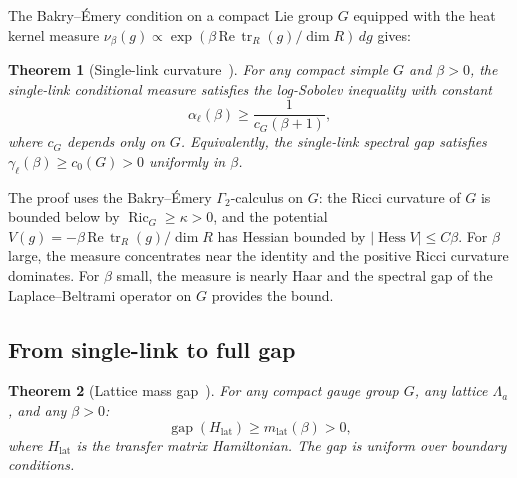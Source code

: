 \documentclass[11pt,a4paper]{article}
\theoremstyle{plain}
\newtheorem{theorem}{Theorem}[section]
\theoremstyle{definition}
\theoremstyle{remark}
\newcommand{\tr}{\operatorname{tr}}
\newcommand{\Hess}{\operatorname{Hess}}
\newcommand{\Ric}{\operatorname{Ric}}
\newcommand{\gap}{\operatorname{gap}}
\begin{document}
The Bakry--\'Emery condition on a compact Lie group $G$
equipped with the heat kernel measure $\nu_\beta(g) \propto
\exp(\beta\, \text{Re}\,\tr_R(g)/\dim R)\, dg$ gives:

\begin{theorem}[Single-link curvature~\cite{FontesLattice}]
\label{thm:single_link}
For any compact simple $G$ and $\beta > 0$, the single-link
conditional measure satisfies the log-Sobolev inequality
with constant
\begin{equation}
  \alpha_\ell(\beta) \ge \frac{1}{c_G(\beta + 1)},
\end{equation}
where $c_G$ depends only on $G$. Equivalently, the
single-link spectral gap satisfies
$\gamma_\ell(\beta) \ge c_0(G) > 0$ uniformly in $\beta$.
\end{theorem}

The proof uses the Bakry--\'Emery $\Gamma_2$-calculus
on $G$: the Ricci curvature of $G$ is bounded below by
$\Ric_G \ge \kappa > 0$, and the potential
$V(g) = -\beta\,\text{Re}\,\tr_R(g)/\dim R$ has
Hessian bounded by $|\Hess V| \le C\beta$. For $\beta$
large, the measure concentrates near the identity and the
positive Ricci curvature dominates. For $\beta$ small,
the measure is nearly Haar and the spectral gap of the
Laplace--Beltrami operator on $G$ provides the bound.

\subsection{From single-link to full gap}

\begin{theorem}[Lattice mass gap~\cite{FontesLattice}]
\label{thm:lattice_gap}
For any compact gauge group $G$, any lattice
$\Lambda_a$, and any $\beta > 0$:
\begin{equation}
  \gap(H_{\mathrm{lat}}) \ge m_{\mathrm{lat}}(\beta) > 0,
\end{equation}
where $H_{\mathrm{lat}}$ is the transfer matrix Hamiltonian.
The gap is uniform over boundary conditions.
\end{theorem}
\end{document}
